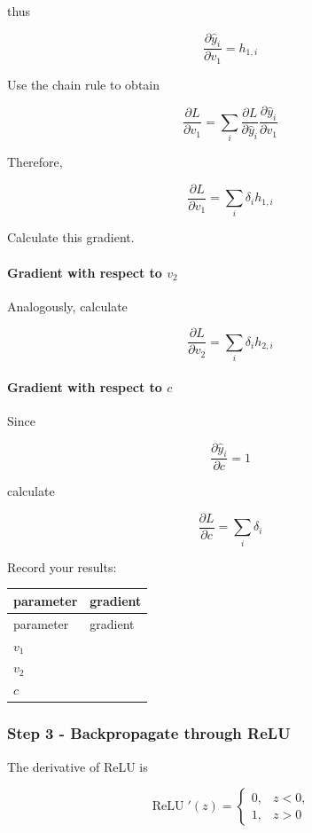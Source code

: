 \documentclass[10pt]{article}
\begin{document}
thus

\[
\frac{\partial \hat y_i}{\partial v_1}=h_{1,i}
\]

Use the chain rule to obtain

\[
\frac{\partial L}{\partial v_1}=\sum_i\frac{\partial L}{\partial\hat y_i}\frac{\partial\hat y_i}{\partial v_1}
\]

Therefore,

\[
\frac{\partial L}{\partial v_1}=\sum_i \delta_i h_{1,i}
\]

Calculate this gradient.

\paragraph*{Gradient with respect to $v_2$}
Analogously, calculate

\[
\frac{\partial L}{\partial v_2}=\sum_i \delta_i h_{2,i}
\]

\paragraph*{Gradient with respect to $c$}
Since

\[
\frac{\partial\hat y_i}{\partial c}=1
\]

calculate

\[
\frac{\partial L}{\partial c}=\sum_i\delta_i
\]

Record your results:

\begingroup
\small
\setlength{\tabcolsep}{4pt}
\begin{longtable}{l|l}
parameter & gradient \\[1.5pt]
\hline
\endfirsthead
parameter & gradient \\[1.5pt]
\hline
\endhead
\rule{0pt}{2.4ex}$v_1$ &  $\phantom{-0.00}$ \\[3pt]
\rule{0pt}{2.4ex}$v_2$ &  $\phantom{-0.00}$ \\[3pt]
\rule{0pt}{2.4ex}$c$ &  $\phantom{-0.00}$ \\[3pt]
\end{longtable}
\endgroup
\subsubsection*{Step 3 - Backpropagate through ReLU}
The derivative of ReLU is

\[
\operatorname{ReLU}'(z)=
\begin{cases}
0, & z<0,\\1, & z>0
\end{cases}
\]
\end{document}
